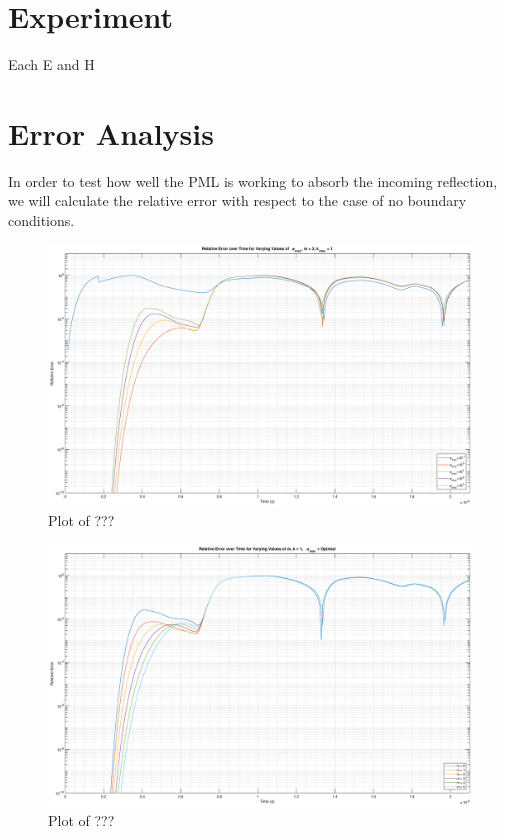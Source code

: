 \message{ !name(ECE742Project.tex)}\documentclass{article}
\begin{document}
\section{Experiment}
Each E and H 


\section{Error Analysis}
In order to test how well the PML is working to absorb the incoming reflection,
we will calculate the relative error with respect to the case of no boundary
conditions.

\begin{figure}
  \centering
  \includegraphics[width=\textwidth]{Rel_Err_SigMax_m3}
  \caption{Plot of ???}\label{fig:RelErrSigmaxm3}
\end{figure}

\begin{figure}
  \centering
  \includegraphics[width=\textwidth]{Rel_Err_m}
  \caption{Plot of ???}\label{fig:RelErrm}
\end{figure}
\end{document}
